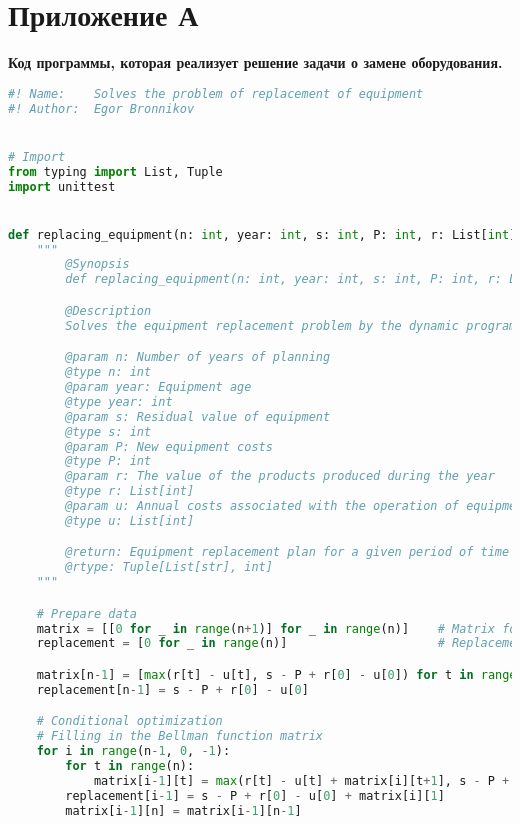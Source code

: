 \section*{Приложение А}
\label{sec:appendix1}

\begin{center}
    \textbf{Код программы, которая реализует решение задачи о замене оборудования.}
\end{center}

\begin{lstlisting}[language=Python]
#! Name:    Solves the problem of replacement of equipment
#! Author:  Egor Bronnikov


# Import
from typing import List, Tuple
import unittest


def replacing_equipment(n: int, year: int, s: int, P: int, r: List[int], u: List[int]) -> Tuple[List[str], int]:
    """
        @Synopsis
        def replacing_equipment(n: int, year: int, s: int, P: int, r: List[int], u: List[int]) -> Tuple[List[str], int]: ...

        @Description
        Solves the equipment replacement problem by the dynamic programming method.

        @param n: Number of years of planning
        @type n: int
        @param year: Equipment age
        @type year: int
        @param s: Residual value of equipment
        @type s: int
        @param P: New equipment costs
        @type P: int
        @param r: The value of the products produced during the year
        @type r: List[int]
        @param u: Annual costs associated with the operation of equipment
        @type u: List[int]

        @return: Equipment replacement plan for a given period of time `n` and the maximum profit (the target function value).
        @rtype: Tuple[List[str], int]
    """

    # Prepare data
    matrix = [[0 for _ in range(n+1)] for _ in range(n)]    # Matrix for Bellman function
    replacement = [0 for _ in range(n)]                     # Replacement rate

    matrix[n-1] = [max(r[t] - u[t], s - P + r[0] - u[0]) for t in range(n+1)]
    replacement[n-1] = s - P + r[0] - u[0]

    # Conditional optimization
    # Filling in the Bellman function matrix
    for i in range(n-1, 0, -1):
        for t in range(n):
            matrix[i-1][t] = max(r[t] - u[t] + matrix[i][t+1], s - P + r[0] - u[0] + matrix[i][1])
        replacement[i-1] = s - P + r[0] - u[0] + matrix[i][1]
        matrix[i-1][n] = matrix[i-1][n-1]


\end{lstlisting}
